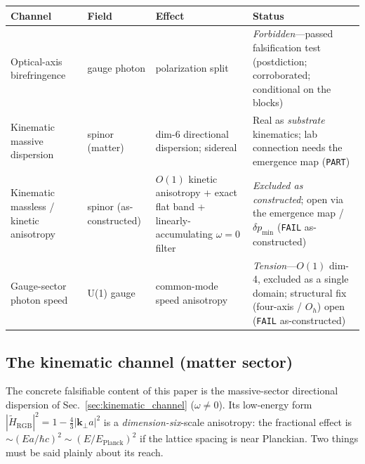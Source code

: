 {\small
\begin{center}
\begin{tabular}{@{}p{3.5cm}p{1.9cm}p{3.6cm}p{3.4cm}@{}}
\hline
\textbf{Channel} & \textbf{Field} & \textbf{Effect} & \textbf{Status} \\
\hline
Optical-axis birefringence & gauge photon & polarization split & \emph{Forbidden}---passed falsification test (postdiction; corroborated; conditional on the blocks) \\
Kinematic massive dispersion & spinor (matter) & dim-6 directional dispersion; sidereal & Real as \emph{substrate} kinematics; lab connection needs the emergence map (\texttt{PART}) \\
Kinematic massless / kinetic anisotropy & spinor (as-constructed) & $O(1)$ kinetic anisotropy + exact flat band + linearly-accumulating $\omega=0$ filter & \emph{Excluded as constructed}; open via the emergence map / $\delta p_\text{min}$ (\texttt{FAIL} as-constructed) \\
Gauge-sector photon speed & U(1) gauge & common-mode speed anisotropy & \emph{Tension}---$O(1)$ dim-4, excluded as a single domain; structural fix (four-axis / $O_h$) open (\texttt{FAIL} as-constructed) \\
\hline
\end{tabular}
\end{center}
}

\subsection{The kinematic channel (matter sector)}
\label{subsec:kinematic_channel_falsif}

The concrete falsifiable content of this paper is the massive-sector directional
dispersion of Sec.~\ref{sec:kinematic_channel} ($\omega\neq0$). Its low-energy form
$|\tilde H_\text{RGB}|^2 = 1 - \tfrac43|\mathbf{k}_\perp a|^2$ is a
\emph{dimension-six}-scale anisotropy: the fractional effect is $\sim(E a/\hbar c)^2
\sim (E/E_\text{Planck})^2$ if the lattice spacing is near Planckian. Two things must
be said plainly about its reach.

